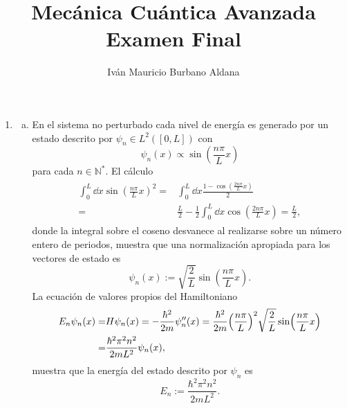 \documentclass{article}
\title{Mecánica Cuántica Avanzada\\ Examen Final}
\author{Iván Mauricio Burbano Aldana}
\begin{document}
\maketitle

\begin{enumerate}[1)]

\item

\begin{enumerate}[a)]

\item En el sistema no perturbado cada nivel de energía es generado por un estado descrito por $\psi_n\in L^2([0,L])$ con
\begin{equation}
\psi_n(x)\propto\sin(\frac{n\pi}{L}x)
\end{equation}
para cada $n\in\mathbb{N}^*$. El cálculo
\begin{align}
\begin{split}
\int_0^L\dd{x}\sin(\frac{n\pi}{L}x)^2=&\int_0^L\dd{x}\frac{1-\cos(\frac{2n\pi}{L}x)}{2}\\
=&\frac{L}{2}-\frac{1}{2}\int_0^L\dd{x}\cos(\frac{2n\pi}{L}x)=\frac{L}{2},
\end{split}
\end{align}
donde la integral sobre el coseno desvanece al realizarse sobre un número entero de periodos, muestra que una normalización apropiada para los vectores de estado es
\begin{equation}
\psi_n(x):=\sqrt{\frac{2}{L}}\sin(\frac{n\pi}{L}x).
\end{equation}
La ecuación de valores propios del Hamiltoniano
\begin{align}
\begin{split}
E_n\psi_n(x)=&H\psi_n(x)=-\frac{\hbar^2}{2m}\psi_n''(x)=\frac{\hbar^2}{2m}\qty(\frac{n\pi}{L})^2\sqrt{\frac{2}{L}}\sin(\frac{n\pi}{L}x)\\
=&\frac{\hbar^2\pi^2n^2}{2mL^2}\psi_n(x),
\end{split}
\end{align}
muestra que la energía del estado descrito por $\psi_n$ es
\begin{equation}
E_n:=\frac{\hbar^2\pi^2n^2}{2mL^2}.
\end{equation}


\end{enumerate}
\end{enumerate}
\end{document}
